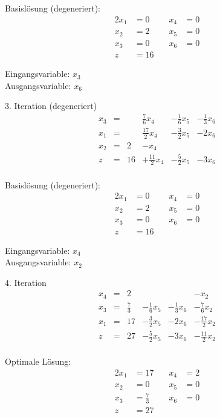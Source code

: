 \documentclass[a4paper]{scrartcl}
\begin{document}
\begin{enumerate}
        Basislösung (degeneriert):
        \begin{alignat*}{2}
            x_1 &= 0 &\quad x_4 &= 0 \\
            x_2 &= 2 &\quad x_5 &= 0 \\
            x_3 &= 0 &\quad x_6 &= 0 \\
            z &= 16
        \end{alignat*}

        Eingangsvariable: $x_3$ \\
        Ausgangsvariable: $x_6$

        3. Iteration (degeneriert)
        \begin{equation}
            \begin{array}{rcrrrr}
                x_3 & = &   & \frac{7}{6}x_4 & -\frac{1}{6}x_5 & -\frac{1}{3}x_6 \\
                x_1 & = &   & \frac{17}{2}x_4 & -\frac{3}{2}x_5 & -2x_6 \\
                x_2 & = & 2 & -x_4 & & \\
                \hline
                z   & = & 16 & +\frac{11}{2}x_4 & -\frac{5}{2}x_5 & -3x_6\\
            \end{array}
        \end{equation}

        Basislösung (degeneriert):
        \begin{alignat*}{2}
            x_1 &= 0 &\quad x_4 &= 0 \\
            x_2 &= 2 &\quad x_5 &= 0 \\
            x_3 &= 0 &\quad x_6 &= 0 \\
            z &= 16
        \end{alignat*}

        Eingangsvariable: $x_4$ \\
        Ausgangsvariable: $x_2$

        4. Iteration
        \begin{equation}
            \begin{array}{rcrrrr}
                x_4 & = & 2 & & & -x_2 \\
                x_3 & = & \frac{7}{3} & -\frac{1}{6}x_5 & -\frac{1}{3}x_6 & -\frac{7}{6}x_2 \\
                x_1 & = & 17 & -\frac{3}{2}x_5 & -2x_6 & -\frac{17}{2}x_2 \\
                \hline
                z   & = & 27 & -\frac{5}{2}x_5 & -3x_6 & -\frac{11}{2}x_2\\
            \end{array}
        \end{equation}

        Optimale Lösung:
        \begin{alignat*}{2}
            x_1 &= 17 &\quad x_4 &= 2 \\
            x_2 &= 0 &\quad x_5 &= 0 \\
            x_3 &= \frac{7}{3} &\quad x_6 &= 0 \\
            z &= 27
        \end{alignat*}


\end{enumerate}
\end{document}
